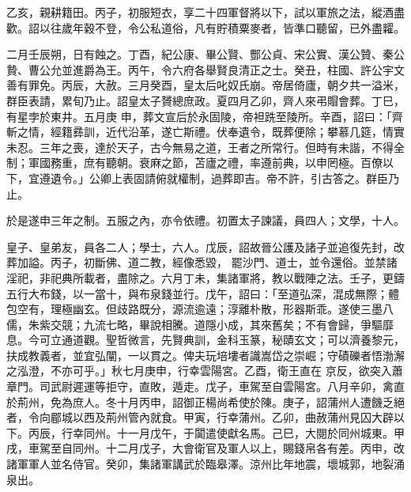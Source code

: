 \begin{pinyinscope}
 乙亥，親耕籍田。丙子，初服短衣，享二十四軍督將以下，試以軍旅之法，縱酒盡歡。詔以往歲年穀不登，令公私道俗，凡有貯積粟麥者，皆準口聽留，已外盡糶。



 二月壬辰朔，日有蝕之。丁酉，紀公康、畢公賢、酆公貞、宋公實、漢公贊、秦公贄、曹公允並進爵為王。丙午，令六府各舉賢良清正之士。癸丑，柱國、許公宇文善有罪免。丙辰，大赦。三月癸酉，皇太后叱奴氏崩。帝居倚廬，朝夕共一溢米，群臣表請，累旬乃止。詔皇太子贇總庶政。夏四月乙卯，齊人來弔賵會葬。丁巳，有星孛於東井。五月庚
 申，葬文宣后於永固陵，帝袒跣至陵所。辛酉，詔曰：「齊斬之情，經籍彞訓，近代沿革，遂亡斯禮。伏奉遺令，既葬便除；攀慕几筵，情實未忍。三年之喪，達於天子，古今無易之道，王者之所常行。但時有未諧，不得全制；軍國務重，庶有聽朝。衰麻之節，苫廬之禮，率遵前典，以申罔極。百僚以下，宜遵遺令。」公卿上表固請俯就權制，過葬即吉。帝不許，引古答之。群臣乃止。



 於是遂申三年之制。五服之內，亦令依禮。初置太子諫議，員四人；文學，十人。



 皇子、皇弟友，員各二人；學士，六人。戊辰，詔故晉公護及諸子並追復先封，改葬加謚。丙子，初斷佛、道二教，經像悉毀，
 罷沙門、道士，並令還俗。並禁諸淫祀，非祀典所載者，盡除之。六月丁未，集諸軍將，教以戰陣之法。壬子，更鑄五行大布錢，以一當十，與布泉錢並行。戊午，詔曰：「至道弘深，混成無際；體包空有，理極幽玄。但歧路既分，源流逾遠；淳離朴散，形器斯乖。遂使三墨八儒，朱紫交競；九流七略，畢說相騰。道隱小成，其來舊矣；不有會歸，爭驅靡息。今可立通道觀。聖哲微言，先賢典訓，金科玉篆，秘賾玄文；可以濟養黎元，扶成教義者，並宜弘闡，一以貫之。俾夫玩培塿者識嵩岱之崇崛；守磧礫者悟渤澥之泓澄，不亦可乎。」秋七月庚申，行幸雲陽宮。乙酉，衛王直在
 京反，欲突入蕭章門。司武尉遲運等拒守，直敗，遁走。戊子，車駕至自雲陽宮。八月辛卯，禽直於荊州，免為庶人。冬十月丙申，詔御正楊尚希使於陳。庚子，詔蒲州人遭饑乏絕者，令向郿城以西及荊州管內就食。甲寅，行幸蒲州。乙卯，曲赦蒲州見囚大辟以下。丙辰，行幸同州。十一月戊午，于闐遣使獻名馬。己巳，大閱於同州城東。甲戌，車駕至自同州。十二月戊子，大會衛官及軍人以上，賜錢帛各有差。丙申，改諸軍軍人並名侍官。癸卯，集諸軍講武於臨皋澤。涼州比年地震，壞城郭，地裂涌泉出。




\end{pinyinscope}
